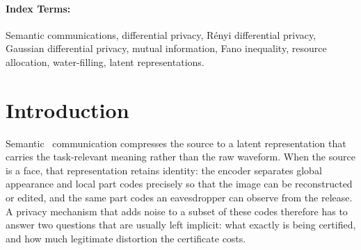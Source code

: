 \documentclass[10pt,twocolumn,letterpaper]{article}
\providecommand{\IEEEPARstart}[2]{#1#2\ }
\theoremstyle{plain}
\theoremstyle{definition}
\newenvironment{IEEEkeywords}{\paragraph{Index Terms:}}{}
\begin{document}
\begin{abstract}
Decomposed latents in semantic communication retain a subject's identity, yet
existing designs certify protection from the \emph{appearance} of the released
noise rather than from an auditable budget, and report no adversary
identification bound. We develop a framework that quantifies both. The
per-component $\ell_2$ sensitivity is isolated and correct quadrature
bookkeeping is distinguished from looser linear practices: at a low-noise
operating point, amplitude-only $\ell_1$ accounting reports
$\varepsilon\approx693$ where the rigorous Gaussian tail bound gives
$\approx2441$ and the quadrature account gives $2000$ (a Gaussian-proxy
re-pricing of a reference operating point). Two independent guarantees are
derived. A $(\varepsilon,\delta)$-DP account via R\'enyi and Gaussian DP
audits the release; a Gaussian worst-case mutual-information bound with Fano's
inequality gives an identification-error floor $\tau$ with ceiling
$\tau_{\max}(K)$. Neither implies the other. Post-processing leaves both
unchanged, so a public invertible shaping network cannot help Bob without
helping Eve. The induced budget program has a closed-form water-filling KKT
solution. On a SemanticStyleGAN calibration, $65{,}536$ prior codes fix each
block's power and sensitivity and noise sweeps fix utility weights; the
accounting ordering, its dependence on task--private overlap, and the failure
of amplitude-only accounting are reproduced. The perceptual score and attack
error remain surrogates; source statistics are a pushforward of the generator
prior, not an inversion of real identities.
\end{abstract}

\begin{IEEEkeywords}
Semantic communications, differential privacy, R\'enyi differential privacy,
Gaussian differential privacy, mutual information, Fano inequality, resource
allocation, water-filling, latent representations.
\end{IEEEkeywords}

\section{Introduction}
\label{sec:intro}

\IEEEPARstart{S}{emantic} communication compresses the source to a latent
representation that carries the task-relevant meaning rather than the raw
waveform. When the source is a face, that representation retains identity:
the encoder separates global appearance and local part codes precisely so that
the image can be reconstructed or edited, and the same part codes an eavesdropper
can observe from the release. A privacy mechanism that adds noise to a subset
of these codes therefore has to answer two questions that are usually left
implicit: what exactly is being certified, and how much legitimate distortion
the certificate costs.
\end{document}
